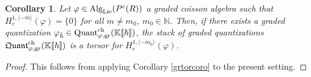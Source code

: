 \documentclass[11pt]{amsart}
\numberwithin{equation}{section}
\newtheorem{coro}[theo]{Corollary}
\theoremstyle{definition}
\newcommand{\bb}{\mathbb}
\newcommand{\fph}{{[\![\hbar]\!]}}
\newcommand{\gd}{{\textup{gr}}}
\newcommand{\K}{{\bb K}}
\newcommand{\Quant}{{\textup{Quant}}}
\newcommand{\fQuant}{{\mathfrak{Quant}}}
\newcommand{\Alg}{{\textup{Alg}}}
\newcommand{\Lie}{{\textup{Lie}}}
\newcommand{\ch}{{\textup{ch}}}
\newcommand{\0}{{\textbf{0}}}
\def\IN{\mathbb{N}}
\def\ch{{\rm ch}}
\begin{document}
\begin{coro}\label{cor:torsor if cohomology is in single graded degree}
	Let $\varphi\in \Alg_{\Lie}(P^c(R))$ a graded coisson algebra such that \mbox{$H^{1,\langle -m \rangle}_{c}(\varphi)=\{0\}$} for all $m\neq m_0$, $m_0 \in \IN$. Then, if there exists a  graded quantization $\varphi_{\hat{\hbar}}\in \Quant^\ch_{\varphi,\gd}(\K\fph)$, the stack of  graded quantizations $\fQuant^\ch_{\varphi,\gd}(\K\fph)  $ is a torsor for $H^{1,\langle -m_0 \rangle}_{c}(\varphi)$.
\end{coro}
\begin{proof}
	This follows from applying Corollary \ref{grtorcoro} to the present setting.
\end{proof}
\end{document}
